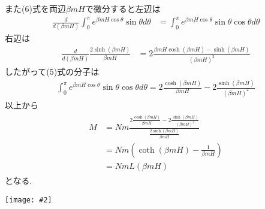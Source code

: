 \documentclass[uplatex,a4j,11pt,dvipdfmx]{jsarticle}
\makeatletter
\def\fgcaption{\def\@captype{figure}\caption}
\newcommand{\mfig}[3][width=15cm]{
\begin{center}
\texttt{[image: \#2]}
\fgcaption{#3 \label{fig:#2}}
\end{center}
}
\makeatother
\begin{document}
また(6)式を両辺$\beta mH$で微分すると左辺は
\begin{align}
  \frac{d}{d(\beta mH)}\int_0^\pi e^{\beta mH\cos\theta} \sin\theta d\theta&=\int_0^\pi e^{\beta mH\cos\theta} \sin\theta\cos\theta d\theta
\end{align}
右辺は
\begin{align}
  \frac{d}{d(\beta mH)}\frac{2\sinh(\beta mH)}{\beta mH}&=2\frac{\beta mH\cosh(\beta mH)-\sinh(\beta mH)}{(\beta mH)^2}
\end{align}
したがって(5)式の分子は
\begin{align}
  \int_0^\pi e^{\beta mH\cos\theta} \sin\theta\cos\theta d\theta=2\frac{\cosh(\beta mH)}{\beta mH}-2\frac{\sinh(\beta mH)}{(\beta mH)^2}
\end{align}
以上から
\begin{align}
  \begin{split}
    M&=Nm\frac{2\frac{\cosh(\beta mH)}{\beta mH}-2\frac{\sinh(\beta mH)}{(\beta mH)^2}}{\frac{2\sinh(\beta mH)}{\beta mH}}\\
    &=Nm\left(\coth(\beta mH)-\frac{1}{\beta mH}\right)\\
    &=NmL(\beta mH)
  \end{split}
\end{align}
となる.
\mfig[width=6cm]{dA.jpg}{$\theta$から$\theta+d\theta$の面積}

\end{document}
